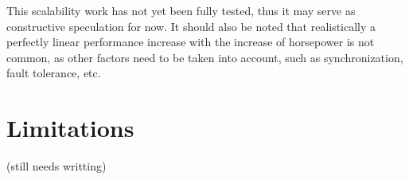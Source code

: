 This scalability work has not yet been fully tested, thus it may serve as constructive speculation for now. It should also be noted that realistically a perfectly linear performance increase with the increase of horsepower is not common, as other factors need to be taken into account, such as synchronization, fault tolerance, etc.





\section{Limitations}
\label{sec:limitations}

(still needs writting)

